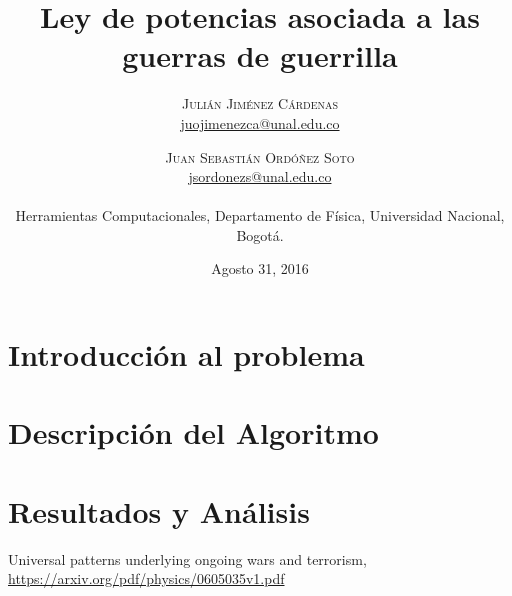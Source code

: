 \documentclass[twoside,twocolumn]{article}
\title{Ley de potencias asociada a las guerras de guerrilla} %
\author{%
\textsc{Julián Jiménez Cárdenas} \\[1ex] %
\normalsize \href{mailto:juojimenezca@unal.edu.co}{juojimenezca@unal.edu.co} %
\and %
\textsc{Juan Sebastián Ordóñez Soto} \\[1ex]
\normalsize \href{mailto:jsordonezs@unal.edu.co}{jsordonezs@unal.edu.co} 
\\ \\ \normalsize{Herramientas Computacionales, Departamento de Física, Universidad Nacional, Bogotá.} %
}
\date{\normalsize{Agosto 31, 2016}} %
\begin{document}
\maketitle

\section{Introducción al problema}
   


\section{Descripción del Algoritmo}


\section{Resultados y Análisis}


\begin{thebibliography}{99} %

Universal patterns underlying ongoing wars and terrorism, \url{https://arxiv.org/pdf/physics/0605035v1.pdf}

\end{thebibliography}


\end{document}
